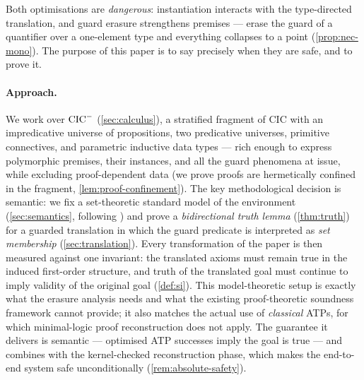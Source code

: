 Both optimisations are \emph{dangerous}: instantiation interacts
with the type-directed translation, and guard erasure strengthens
premises --- erase the guard of a quantifier over a one-element
type and everything collapses to a point
(\cref{prop:nec-mono}).  The purpose of this paper is to say
precisely when they are safe, and to prove it.

\paragraph{Approach.}
We work over $\mathrm{CIC}^{-}$ (\cref{sec:calculus}), a stratified fragment
of CIC with an impredicative universe of propositions, two
predicative universes, primitive connectives, and parametric
inductive data types --- rich enough to express polymorphic
premises, their instances, and all the guard phenomena at issue,
while excluding proof-dependent data (we prove proofs are
hermetically confined in the fragment,
\cref{lem:proof-confinement}).  The key methodological decision is
semantic: we fix a set-theoretic standard model of the environment
(\cref{sec:semantics}, following
\cite{Werner1997,Aczel1998,LeeWerner2011}) and prove a
\emph{bidirectional truth lemma} (\cref{thm:truth}) for a guarded
translation in which the guard predicate is interpreted as
\emph{set membership} (\cref{sec:translation}).  Every
transformation of the paper is then measured against one invariant:
the translated axioms must remain true in the induced first-order
structure, and truth of the translated goal must continue to imply
validity of the original goal (\cref{def:si}).  This
model-theoretic setup is exactly what the erasure analysis needs
and what the existing proof-theoretic soundness framework
\cite{Czajka2016} cannot provide; it also matches the actual use of
\emph{classical} ATPs, for which minimal-logic proof reconstruction
does not apply.  The guarantee it delivers is semantic ---
optimised ATP successes imply the goal is true --- and combines
with the kernel-checked reconstruction phase, which makes the
end-to-end system safe unconditionally
(\cref{rem:absolute-safety}).

